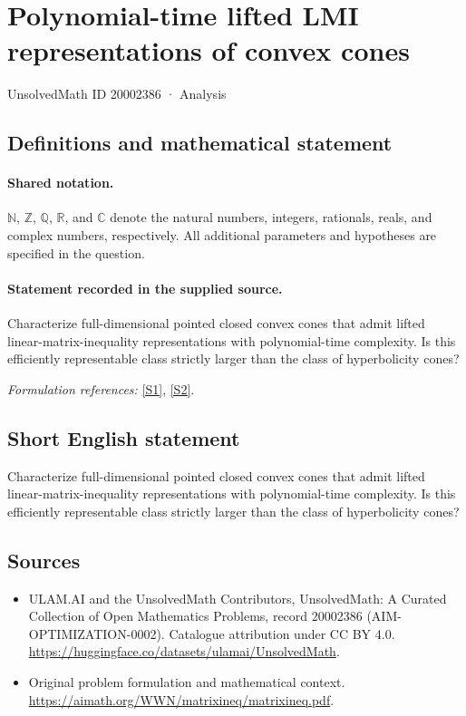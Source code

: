 \documentclass[11pt]{article}
\newcommand{\sref}[2]{\hyperlink{source:#1:#2}{[S#2]}}
\begin{document}
\setcounter{section}{20002385}
\section{Polynomial-time lifted LMI representations of convex cones}\label{20002386}
{\small UnsolvedMath ID 20002386 · Analysis}
\subsection{Definitions and mathematical statement}

\paragraph{Shared notation.}$\mathbb N$, $\mathbb Z$, $\mathbb Q$, $\mathbb R$, and $\mathbb C$ denote the natural numbers, integers, rationals, reals, and complex numbers, respectively. All additional parameters and hypotheses are specified in the question.


\paragraph{Statement recorded in the supplied source.}
Characterize full-dimensional pointed closed convex cones that admit lifted linear-matrix-inequality representations with polynomial-time complexity. Is this efficiently representable class strictly larger than the class of hyperbolicity cones?
\par\smallskip\textit{Formulation references:} \sref{20002386}{1}, \sref{20002386}{2}.
\subsection{Short English statement}
Characterize full-dimensional pointed closed convex cones that admit lifted linear-matrix-inequality representations with polynomial-time complexity. Is this efficiently representable class strictly larger than the class of hyperbolicity cones?
\subsection{Sources}
\begin{itemize}
\item[\hypertarget{source:20002386:1}{S1}] ULAM.AI and the UnsolvedMath Contributors, UnsolvedMath: A Curated Collection of Open Mathematics Problems, record 20002386 (AIM-OPTIMIZATION-0002). Catalogue attribution under CC BY 4.0.
\url{https://huggingface.co/datasets/ulamai/UnsolvedMath}.
\item[\hypertarget{source:20002386:2}{S2}] Original problem formulation and mathematical context.
\url{https://aimath.org/WWN/matrixineq/matrixineq.pdf}.
\end{itemize}
\label{end:20002386}
\end{document}
